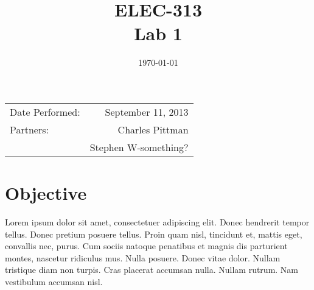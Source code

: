 \documentclass{article}
\author{}
\title{ELEC-313 \\ Lab 1 \\ }
\date{\today}
\begin{document}
\maketitle %

 \begin{center}
   \begin{tabular}{lr}
    Date Performed: & September 11, 2013 \\
    Partners: & Charles Pittman \\
              & Stephen W-something? \\
  \end{tabular}
\end{center}

\pagebreak



\renewcommand{\labelenumi}{\alph{enumi}.}

\section{Objective}

\label{sec:objective}

Lorem ipsum dolor sit amet, consectetuer adipiscing elit. Donec
hendrerit tempor tellus. Donec pretium posuere tellus. Proin quam
nisl, tincidunt et, mattis eget, convallis nec, purus. Cum sociis
natoque penatibus et magnis dis parturient montes, nascetur ridiculus
mus. Nulla posuere. Donec vitae dolor. Nullam tristique diam non
turpis. Cras placerat accumsan nulla. Nullam rutrum. Nam vestibulum
accumsan nisl.

\end{document}

